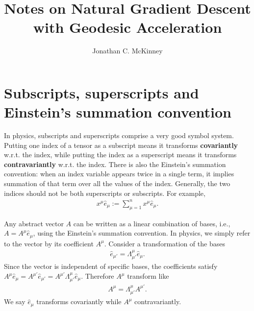 \documentclass{amsart}
\theoremstyle{definition}
\theoremstyle{remark}
\numberwithin{equation}{section}
\begin{document}
\title{Notes on
	Natural Gradient Descent with Geodesic Acceleration}

\author{Jonathan C. McKinney}
\address{Computer Science Department, Stanford University, California, 94305}
\date{}

\maketitle
\section{Subscripts, superscripts and Einstein's summation convention}
In physics, subscripts and superscripts comprise a very good symbol system. Putting one index of a tensor as a subscript means it transforms \textbf{covariantly} w.r.t. the index, while putting the index as a superscript means it transforms \textbf{contravariantly} w.r.t. the index. There is also the Einstein's summation convention: when an index variable appears twice in a single term, it implies summation of that term over all the values of the index. Generally, the two indices should not be both superscripts or subscripts. For example,
\begin{align*}
x^\mu \hat{e}_{\mu} := \sum_{\mu=1}^n x^\mu \hat{e}_{\mu}.
\end{align*}

Any abstract vector $A$ can be written as a linear combination of bases, i.e., $A = A^\mu \hat{e}_\mu$, using the Einstein's summation convention. In physics, we simply refer to the vector by its coefficient $A^\mu$. Consider a transformation of the bases
\begin{align*}
\hat{e}_{\mu'} = \Lambda_{\mu'}^{\mu} \hat{e}_{\mu}.
\end{align*}
Since the vector is independent of specific bases, the coefficients satisfy $A^\mu \hat{e}_\mu = A^{\mu'} \hat{e}_{\mu'} = A^{\mu'} \Lambda_{\mu'}^{\mu} \hat{e}_{\mu}$. Therefore $A^\mu$ transform like
\begin{align*}
A^{\mu} =  \Lambda_{\mu'}^{\mu}A^{\mu'}.
\end{align*}
We say $\hat{e}_{\mu}$ transforms covariantly while $A^{\mu}$ contravariantly.
\end{document}
